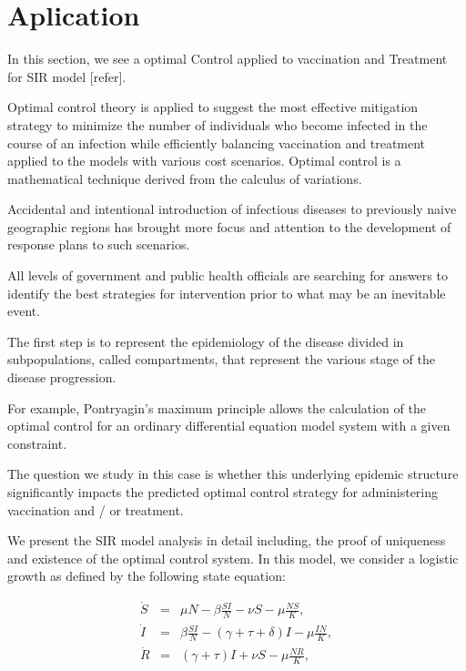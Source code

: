 \section{Aplication}

In this section, we see a optimal Control applied to vaccination and Treatment 
for SIR model [refer].

Optimal control theory is applied to suggest the most effective mitigation 
strategy to minimize the number of individuals who become infected in the 
course of an infection while efficiently balancing vaccination and treatment 
applied to the models with various cost scenarios. Optimal control is a  
mathematical technique derived from the calculus of variations.

Accidental and intentional introduction of infectious diseases  to previously 
naive geographic regions has brought more focus and attention to the 
development of response plans to such scenarios.

All levels of government and public health officials are searching for answers 
to identify the best strategies for intervention prior to what may be an 
inevitable event.

The first step is to represent the epidemiology of the disease divided in 
subpopulations, called compartments, that represent the various stage of the 
disease progression.

For example, Pontryagin’s maximum principle allows the calculation of the 
optimal control for an ordinary differential equation model system with a given 
constraint.

The question  we study in this case is whether this underlying epidemic 
structure significantly impacts the predicted optimal control strategy for 
administering vaccination and / or treatment.

We present the SIR model analysis in detail including, the proof of uniqueness 
and existence of the optimal control system. In this model, we consider a 
logistic growth as defined by the following state equation:

\begin{eqnarray}\label{eq.1.4.SIR}
\dot{S}  &=& \mu N-\beta\frac{SI}{N}-\nu S -\mu \frac{NS}{K}, \label{eq.1.4.1}  
\\
\dot{I}   &=& \beta\frac{SI}{N} - (\gamma+\tau+\delta) I -\mu \frac{IN}{K}, 
\label{eq.1.4.2} \\
\dot{R} &=& (\gamma+\tau) I+\nu S - \mu \frac{NR}{K},  \label{eq.1.4.3}
\end{eqnarray}

